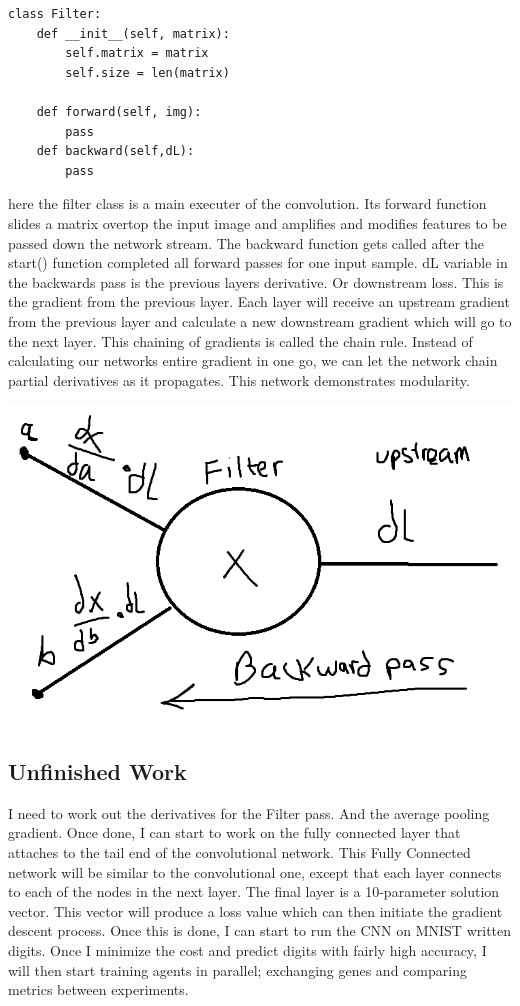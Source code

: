 \documentclass[journal]{IEEEtai}
\begin{document}
\begin{lstlisting}
class Filter:
    def __init__(self, matrix):
        self.matrix = matrix
        self.size = len(matrix)

    def forward(self, img):
        pass
    def backward(self,dL):
        pass
\end{lstlisting}

here the filter class is a main executer of the convolution. Its forward function slides a matrix overtop the input image and amplifies and modifies features to be passed down the network stream. The backward function gets called after the start() function completed all forward passes for one input sample. dL variable in the backwards pass is the previous layers derivative. Or downstream loss. This is the gradient from the previous layer. Each layer will receive an upstream gradient from the previous layer and calculate a new downstream gradient which will go to the next layer. This chaining of gradients is called the chain rule. Instead of calculating our networks entire gradient in one go, we can let the network chain partial derivatives as it propagates. This network demonstrates modularity.

\includegraphics[scale=.4]{modularity.png}

\subsection{Unfinished Work}
I need to work out the derivatives for the Filter pass. And the average pooling gradient. Once done, I can start to work on the fully connected layer that attaches to the tail end of the convolutional network. This Fully Connected network will be similar to the convolutional one, except that each layer connects to each of the nodes in the next layer. The final layer is a 10-parameter solution vector. This vector will produce a loss value which can then initiate the gradient descent process.
Once this is done, I can start to run the CNN on MNIST written digits. Once I minimize the cost and predict digits with fairly high accuracy, I will then start training agents in parallel; exchanging genes and comparing metrics between experiments.
\end{document}
